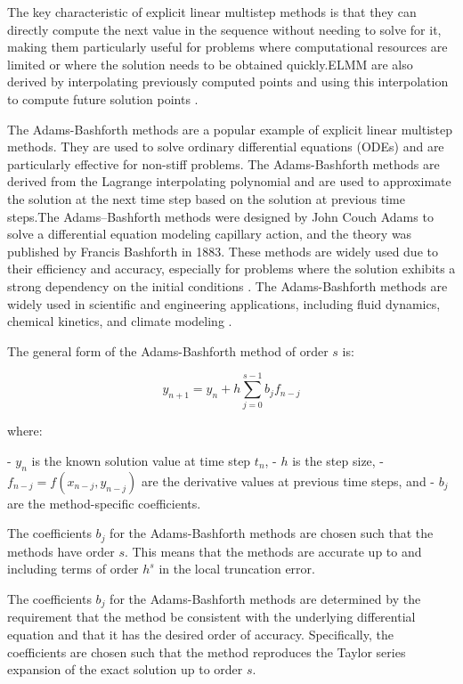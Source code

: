 \documentclass[a4paper, twoside]{report} %
\begin{document}
	The key characteristic of explicit linear multistep methods is that they can directly compute the next value in the sequence without needing to solve for it, making them particularly useful for problems where computational resources are limited or where the solution needs to be obtained quickly.ELMM are also derived by  interpolating previously computed points and using this interpolation to compute future solution points \cite{Alexanderian2022}.

	The Adams-Bashforth methods are a popular example of explicit linear multistep methods. They are used to solve ordinary differential equations (ODEs) and are particularly effective for non-stiff problems. The Adams-Bashforth methods are derived from the Lagrange interpolating polynomial and are used to approximate the solution at the next time step based on the solution at previous time steps.The Adams–Bashforth methods were designed by John Couch Adams to solve a differential equation modeling capillary action, and the theory was published by Francis Bashforth in 1883. These methods are widely used due to their efficiency and accuracy, especially for problems where the solution exhibits a strong dependency on the initial conditions \cite{enwiki:1166346639}. The Adams-Bashforth methods are widely used in scientific and engineering applications, including fluid dynamics, chemical kinetics, and climate modeling \cite{wong2020lecture}.

	The general form of the Adams-Bashforth method of order $s$ is:

	\begin{equation}
		y_{n+1} = y_n + h \sum_{j=0}^{s-1} b_j f_{n-j}
	\end{equation}


	where:

	- $y_n$ is the known solution value at time step $t_n$,
	- $h$ is the step size,
	- $f_{n-j} = f(x_{n-j}, y_{n-j})$ are the derivative values at previous time steps, and
	- $b_j$ are the method-specific coefficients.

	The coefficients $b_j$ for the Adams-Bashforth methods are chosen such that the methods have order $s$. This means that the methods are accurate up to and including terms of order $h^s$ in the local truncation error.

	The coefficients $b_j$ for the Adams-Bashforth methods are determined by the requirement that the method be consistent with the underlying differential equation and that it has the desired order of accuracy. Specifically, the coefficients are chosen such that the method reproduces the Taylor series expansion of the exact solution up to order $s$.
\end{document}
